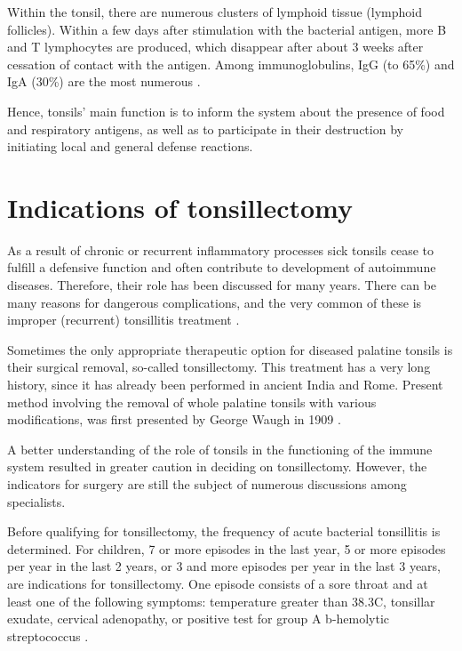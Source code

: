 \documentclass[12pt,a4paper,notitlepage]{report}
\begin{document}
Within the tonsil, there are numerous clusters of lymphoid tissue (lymphoid follicles). Within a few days after stimulation with the bacterial antigen, more B and T lymphocytes are produced, which disappear after about 3 weeks after cessation of contact with the antigen. Among immunoglobulins, IgG (to 65\%) and IgA (30\%) are the most numerous \cite{Niedzielska03}. 

Hence, tonsils' main function is to inform the system about the presence of food and respiratory antigens, as well as to participate in their destruction by initiating local and general defense reactions.


\section{Indications of tonsillectomy}

As a result of chronic or recurrent inflammatory processes sick tonsils cease to fulfill a defensive function and often contribute to development of autoimmune diseases. Therefore, their role has been discussed for many years. There can be many reasons for dangerous complications, and the very common of these is improper (recurrent) tonsillitis treatment \cite{Niedzielska03}.

Sometimes the only appropriate therapeutic option for diseased palatine tonsils is their surgical removal, so-called tonsillectomy. This treatment has a very long history, since it has already been performed in ancient India and Rome. Present method involving the removal of whole palatine tonsils with various modifications, was first presented by George Waugh in 1909 \cite{McNeill60}.

A better understanding of the role of tonsils in the functioning of the immune system resulted in greater caution in deciding on tonsillectomy. However, the indicators for surgery are still the subject of numerous discussions among specialists.

Before qualifying for tonsillectomy, the frequency of acute bacterial tonsillitis is determined. For children, 7 or more episodes in the last year, 5 or more episodes  per year in the last 2 years, or 3 and more episodes per year in the last 3 years, are indications for tonsillectomy. One episode consists of a sore throat and at least one of the following symptoms: temperature greater than 38.3\degree C, tonsillar exudate, cervical adenopathy, or positive test for group A b-hemolytic streptococcus \cite{Baugh11}.
\end{document}
